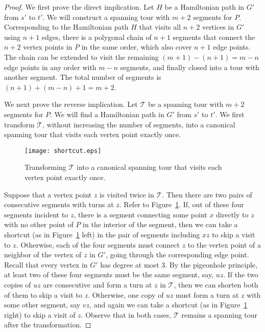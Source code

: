 \documentclass[letterpaper,11pt]{article}
\def\T{{\mathcal T}}
\begin{document}
\begin{proof}
We first prove the direct implication.
Let $H$ be a Hamiltonian path in $G'$ from $s'$ to $t'$.
We will construct a spanning tour with $m+2$ segments for $P$.
Corresponding to the Hamiltonian path $H$
that visits all $n+2$ vertices in $G'$ using $n+1$ edges,
there is a polygonal chain of $n+1$ segments
that connect the $n+2$ vertex points in $P$ in the same order,
which also cover $n+1$ edge points.
The chain can be extended to visit the remaining $(m+1)-(n+1)=m-n$ edge points
in any order with $m-n$ segments,
and finally closed into a tour with another segment.
The total number of segments is $(n+1) + (m-n) + 1 = m+2$.

We next prove the reverse implication.
Let $\T$ be a spanning tour with $m+2$ segments for $P$.
We will find a Hamiltonian path in $G'$ from $s'$ to $t'$.
We first transform $\T$,
without increasing the number of segments,
into a canonical spanning tour that visits each vertex point exactly once.

\begin{figure}[htb]
\centering\texttt{[image: shortcut.eps]}
\caption{Transforming $\T$ into a canonical spanning tour that visits each
vertex point exactly once.}
\label{fig:shortcut}
\end{figure}

Suppose that a vertex point $z$ is visited twice in $\T$.
Then there are two pairs of consecutive segments with turns at $z$.
Refer to Figure~\ref{fig:shortcut}.
If, out of these four segments incident to $z$,
there is a segment connecting some point $x$ directly to $z$
with no other point of $P$ in the interior of the segment,
then we can take a shortcut (as in Figure~\ref{fig:shortcut} left)
in the pair of segments including $xz$ to skip a visit to $z$.
Otherwise, each of the four segments must connect $z$ to the vertex
point of a neighbor of the vertex of $z$ in $G'$,
going through the corresponding edge point.
Recall that every vertex in $G'$ has degree at most $3$.
By the pigeonhole principle,
at least two of these four segments must be the same segment, say, $uz$.
If the two copies of $uz$ are consecutive
and form a turn at $z$ in $\T$,
then we can shorten both of them to skip a visit to $z$.
Otherwise,
one copy of $uz$ must form a turn at $z$
with some other segment, say $vz$,
and again we can take a shortcut (as in Figure~\ref{fig:shortcut} right)
to skip a visit of $z$.
Observe that in both cases,
$\T$ remains a spanning tour after the transformation.


\end{proof}
\end{document}
